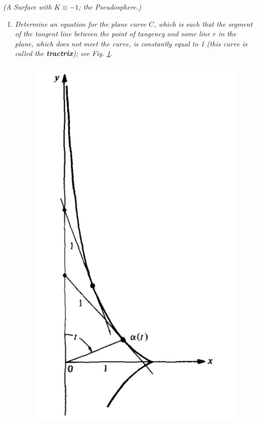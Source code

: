\documentclass[a4paper]{article}
\numberwithin{equation}{section}
\begin{document}
\textit{(A Surface with $K \equiv  - 1$; the Pseudosphere.)} 
\begin{enumerate}
\item \textit{Determine an equation for the plane curve $C$, which is such that the segment of the tangent line between the point of tangency and some line $r$ in the plane, which does not meet the curve, is constantly equal to 1 (this curve is called the \textbf{tractrix}); see Fig. \ref{1}.}
\begin{figure}[H]
\label{1}
\centering
\includegraphics[scale=0.5]{1}

\end{figure}
\end{enumerate}
\end{document}
